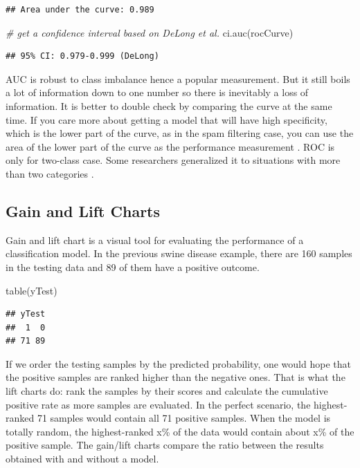 \documentclass[
  12pt,
]{krantz}
\makeatletter
\newenvironment{Shaded}{\begin{snugshade}}{\end{snugshade}}
\newcommand{\CommentTok}[1]{\textcolor[rgb]{0.37,0.37,0.37}{\textit{#1}}}
\newcommand{\FunctionTok}[1]{\textcolor[rgb]{0,0,0}{#1}}
\newcommand{\NormalTok}[1]{#1}
\newenvironment{kframe}{%
\medskip{}
\setlength{\fboxsep}{.8em}
 \def\at@end@of@kframe{}%
 \ifinner\ifhmode%
  \def\at@end@of@kframe{\end{minipage}}%
  \begin{minipage}{\columnwidth}%
 \fi\fi%
 \def\FrameCommand##1{\hskip\@totalleftmargin \hskip-\fboxsep
 \colorbox{shadecolor}{##1}\hskip-\fboxsep
     \hskip-\linewidth \hskip-\@totalleftmargin \hskip\columnwidth}%
 \MakeFramed {\advance\hsize-\width
   \@totalleftmargin\z@ \linewidth\hsize
   \@setminipage}}%
 {\par\unskip\endMakeFramed%
 \at@end@of@kframe}
\renewenvironment{Shaded}{\begin{kframe}}{\end{kframe}}
\makeatother
\begin{document}
\begin{verbatim}
## Area under the curve: 0.989
\end{verbatim}

\begin{Shaded}
\begin{Highlighting}[]
\CommentTok{\# get a confidence interval based on DeLong et al.}
\FunctionTok{ci.auc}\NormalTok{(rocCurve)}
\end{Highlighting}
\end{Shaded}

\begin{verbatim}
## 95% CI: 0.979-0.999 (DeLong)
\end{verbatim}

AUC is robust to class imbalance \citep{Provost1998, Fawcett2006} hence a popular measurement. But it still boils a lot of information down to one number so there is inevitably a loss of information. It is better to double check by comparing the curve at the same time. If you care more about getting a model that will have high specificity, which is the lower part of the curve, as in the spam filtering case, you can use the area of the lower part of the curve as the performance measurement \citep{McClish1989}. ROC is only for two-class case. Some researchers generalized it to situations with more than two categories \citep{Hand2001, Lachiche2003, Li2008}.

\hypertarget{gain-and-lift-charts}{%
\subsection{Gain and Lift Charts}\label{gain-and-lift-charts}}

Gain and lift chart is a visual tool for evaluating the performance of a classification model. In the previous swine disease example, there are 160 samples in the testing data and 89 of them have a positive outcome.

\begin{Shaded}
\begin{Highlighting}[]
\FunctionTok{table}\NormalTok{(yTest)}
\end{Highlighting}
\end{Shaded}

\begin{verbatim}
## yTest
##  1  0 
## 71 89
\end{verbatim}

If we order the testing samples by the predicted probability, one would hope that the positive samples are ranked higher than the negative ones. That is what the lift charts do: rank the samples by their scores and calculate the cumulative positive rate as more samples are evaluated. In the perfect scenario, the highest-ranked 71 samples would contain all 71 positive samples. When the model is totally random, the highest-ranked x\% of the data would contain about x\% of the positive sample. The gain/lift charts compare the ratio between the results obtained with and without a model.
\end{document}
